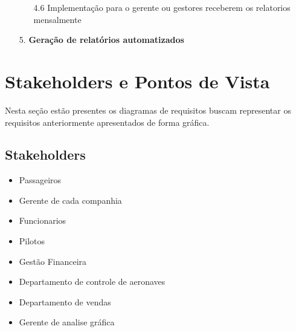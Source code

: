 \begin{enumerate}
{\begin{enumerate}
            \item[4.6] Implementação para o gerente ou gestores receberem os relatorios mensalmente\\
          \end{enumerate}
        }
  \item[5.] \textbf{Geração de relatórios automatizados}
\end{enumerate}




\section{Stakeholders e Pontos de Vista}
Nesta seção estão presentes os diagramas de requisitos 
buscam representar os requisitos anteriormente apresentados de forma gráfica.

\subsection{Stakeholders}


\begin{itemize}
  \item Passageiros
  \item Gerente de cada companhia
  \item Funcionarios
  \item Pilotos
  \item Gestão Financeira
  \item Departamento de controle de aeronaves
  \item Departamento de vendas
  \item Gerente de analise gráfica \\
\end{itemize}





